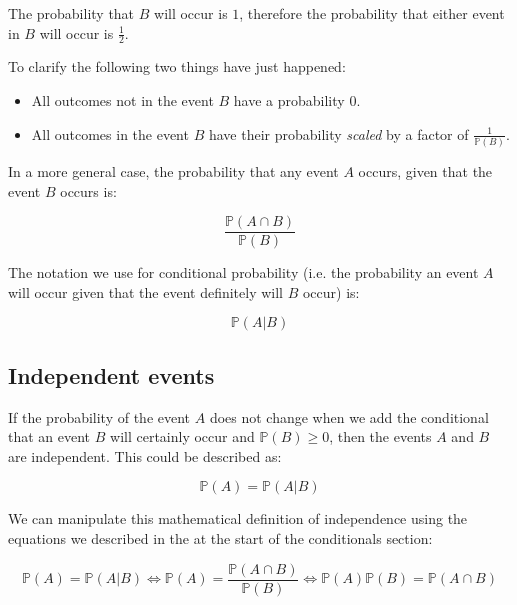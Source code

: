 The probability that $B$ will occur is $1$, therefore the probability that
either event in $B$ will occur is $\frac{1}{2}$.

To clarify the following two things have just happened:

\begin{itemize}
	\item All outcomes not in the event $B$ have a probability $0$.
	\item All outcomes in the event $B$ have their probability {\it scaled} by a
	factor of $\frac{1}{\mathbb{P}(B)}$.
\end{itemize}

In a more general case, the probability that any event $A$ occurs, given that
the event $B$ occurs is:

\begin{dmath*}
	\frac{\mathbb{P}(A \cap B)}{\mathbb{P}(B)}
\end{dmath*}

The notation we use for conditional probability (i.e. the probability an event
$A$ will occur given that the event definitely will $B$ occur) is:

\begin{dmath*}
	\mathbb{P}(A|B)
\end{dmath*}


\subsection{Independent events}

If the probability of the event $A$ does not change when we add the conditional
that an event $B$ will certainly occur and $\mathbb{P}(B) \ge 0$, then the
events $A$ and $B$ are independent. This could be described as:

\begin{dmath*}
	{\mathbb{P}(A) = \mathbb{P}(A|B)}
\end{dmath*}

We can manipulate this mathematical definition of independence using the
equations we described in the at the start of the conditionals section:

\begin{dmath*}
	{\mathbb{P}(A) = \mathbb{P}(A|B)} \iff {\mathbb{P}(A) = \frac{\mathbb{P}(A \cap B)}{\mathbb{P}(B)}} \iff {\mathbb{P}(A)\mathbb{P}(B) = \mathbb{P}(A \cap B)}
\end{dmath*}


